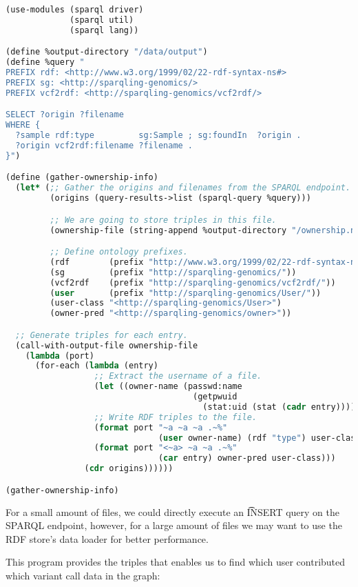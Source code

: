 \begin{lstlisting}[language=Lisp]
(use-modules (sparql driver)
             (sparql util)
             (sparql lang))

(define %output-directory "/data/output")
(define %query "
PREFIX rdf: <http://www.w3.org/1999/02/22-rdf-syntax-ns#>
PREFIX sg: <http://sparqling-genomics/>
PREFIX vcf2rdf: <http://sparqling-genomics/vcf2rdf/>

SELECT ?origin ?filename
WHERE {
  ?sample rdf:type         sg:Sample ; sg:foundIn  ?origin .
  ?origin vcf2rdf:filename ?filename .
}")

(define (gather-ownership-info)
  (let* (;; Gather the origins and filenames from the SPARQL endpoint.
         (origins (query-results->list (sparql-query %query)))

         ;; We are going to store triples in this file.
         (ownership-file (string-append %output-directory "/ownership.n3"))

         ;; Define ontology prefixes.
         (rdf        (prefix "http://www.w3.org/1999/02/22-rdf-syntax-ns#"))
         (sg         (prefix "http://sparqling-genomics/"))
         (vcf2rdf    (prefix "http://sparqling-genomics/vcf2rdf/"))
         (user       (prefix "http://sparqling-genomics/User/"))
         (user-class "<http://sparqling-genomics/User>")
         (owner-pred "<http://sparqling-genomics/owner>"))

  ;; Generate triples for each entry.
  (call-with-output-file ownership-file
    (lambda (port)
      (for-each (lambda (entry)
                  ;; Extract the username of a file.
                  (let ((owner-name (passwd:name
                                      (getpwuid
                                        (stat:uid (stat (cadr entry)))))))
                  ;; Write RDF triples to the file.
                  (format port "~a ~a ~a .~%"
                               (user owner-name) (rdf "type") user-class)
                  (format port "<~a> ~a ~a .~%"
                               (car entry) owner-pred user-class)))
                (cdr origins))))))

(gather-ownership-info)
\end{lstlisting}

  For a small amount of files, we could directly execute an \t{INSERT}
  query on the SPARQL endpoint, however, for a large amount of files we may
  want to use the RDF store's data loader for better performance.

  This program provides the triples that enables us to find which user
  contributed which variant call data in the graph:

